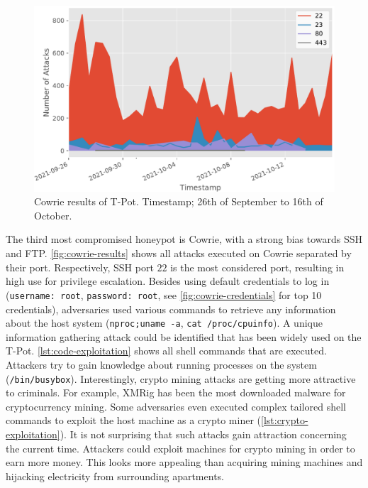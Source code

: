 \begin{figure}
    \centering
    \includegraphics[width=\textwidth]{figures/tpot-cowrie-port.pdf}
    \caption[Cowrie results of T-Pot]{
        Cowrie results of T-Pot.
        Timestamp; 26th of September to 16th of October.
    }
    \label{fig:cowrie-results}
\end{figure}

The third most compromised honeypot is Cowrie, with a strong bias towards SSH and FTP.
\autoref{fig:cowrie-results} shows all attacks executed on Cowrie separated by their port.
Respectively, SSH port $22$ is the most considered port, resulting in high use for privilege escalation.
Besides using default credentials to log in (\verb|username: root|, \verb|password: root|, see \autoref{fig:cowrie-credentials} for top 10 credentials), adversaries used various commands to retrieve any information about the host system (\verb|nproc;uname -a|, \verb|cat /proc/cpuinfo|).
A unique information gathering attack could be identified that has been widely used on the T-Pot.
\autoref{lst:code-exploitation} shows all shell commands that are executed.
Attackers try to gain knowledge about running processes on the system (\verb|/bin/busybox|).
Interestingly, crypto mining attacks are getting more attractive to criminals.
For example, XMRig has been the most downloaded malware for cryptocurrency mining.
Some adversaries even executed complex tailored shell commands to exploit the host machine as a crypto miner (\autoref{lst:crypto-exploitation}).
It is not surprising that such attacks gain attraction concerning the current time.
Attackers could exploit machines for crypto mining in order to earn more money.
This looks more appealing than acquiring mining machines and hijacking electricity from surrounding apartments.

